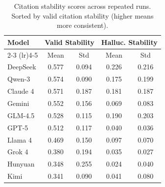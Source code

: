 \begin{table}[t]
\centering
\caption{Citation stability scores across repeated runs. Sorted by valid citation stability (higher means more consistent).}
\label{tab:citation_stability}
\small
\begin{tabular}{lcccc}
\toprule
\textbf{Model} & \multicolumn{2}{c}{\cellcolor{green!14}\textbf{Valid Stability}} & \multicolumn{2}{c}{\cellcolor{red!14}\textbf{Halluc. Stability}} \\
\cmidrule(lr){2-3} \cmidrule(lr){4-5}
 & \cellcolor{green!12}Mean & \cellcolor{green!12}Std & \cellcolor{red!12}Mean & \cellcolor{red!12}Std \\
\midrule
\cellcolor{tableRowLight}DeepSeek & \cellcolor{green!24}0.577 & \cellcolor{green!24}0.094 & \cellcolor{red!18}0.226 & \cellcolor{red!18}0.216 \\
\cellcolor{tableRowWhite}Qwen-3 & \cellcolor{green!24}0.574 & \cellcolor{green!24}0.090 & \cellcolor{red!16}0.175 & \cellcolor{red!16}0.199 \\
\cellcolor{tableRowLight}Claude 4 & \cellcolor{green!24}0.571 & \cellcolor{green!24}0.187 & \cellcolor{red!16}0.181 & \cellcolor{red!16}0.187 \\
\cellcolor{tableRowWhite}Gemini & \cellcolor{green!22}0.552 & \cellcolor{green!22}0.156 & \cellcolor{red!12}0.069 & \cellcolor{red!12}0.083 \\
\cellcolor{tableRowLight}GLM-4.5 & \cellcolor{green!20}0.528 & \cellcolor{green!20}0.115 & \cellcolor{red!16}0.190 & \cellcolor{red!16}0.203 \\
\cellcolor{tableRowWhite}GPT-5 & \cellcolor{green!20}0.512 & \cellcolor{green!20}0.117 & \cellcolor{red!10}0.040 & \cellcolor{red!10}0.036 \\
\cellcolor{tableRowLight}Llama 4 & \cellcolor{green!18}0.469 & \cellcolor{green!18}0.150 & \cellcolor{red!12}0.097 & \cellcolor{red!12}0.070 \\
\cellcolor{tableRowWhite}Grok 4 & \cellcolor{green!14}0.380 & \cellcolor{green!14}0.194 & \cellcolor{red!10}0.035 & \cellcolor{red!10}0.027 \\
\cellcolor{tableRowLight}Hunyuan & \cellcolor{green!14}0.348 & \cellcolor{green!14}0.255 & \cellcolor{red!8}0.024 & \cellcolor{red!8}0.040 \\
\cellcolor{tableRowWhite}Kimi & \cellcolor{green!14}0.341 & \cellcolor{green!14}0.090 & \cellcolor{red!10}0.041 & \cellcolor{red!10}0.080 \\

\end{tabular}
\end{table}
